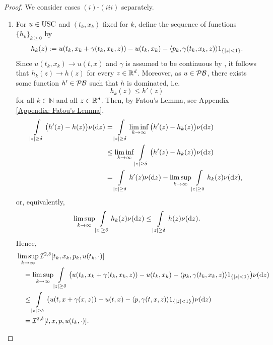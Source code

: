\begin{proof}
    We consider cases $(i)$-$(iii)$ separately. 
    \begin{enumerate}[label=(\roman*)]
        \item For $u \in \operatorname{USC}$ and $(t_k,x_k)$ fixed for $k$, define the sequence of functions $\{h_k\}_{k \geq 0}$ by
        \begin{equation*}
            h_k(z) := u(t_k, x_k + \gamma(t_k,x_k,z)) - u(t_k,x_k) - \langle p_k, \gamma(t_k,x_k,z) \rangle 1_{\left\{|z| < 1\right\}}. 
        \end{equation*}
        Since $u(t_k,x_k) \rightarrow u(t,x)$ and $\gamma$ is assumed to be continuous by , it follows that $h_k(z) \rightarrow h(z)$ for every $z \in \mathbb{R}^d$.  Moreover, as $u \in \mathcal{PB}$, there exists some function $h' \in \mathcal{PB}$ such that $h$ is dominated, i.e.
        \begin{equation*}
            h_k(z) \leq h'(z)
        \end{equation*}
        for all $k \in \mathbb N$ and all $z \in \mathbb{R}^d$. Then, by Fatou's Lemma, see Appendix \ref{Appendix: Fatou's Lemma}, 
        \begin{align*}
            \int\limits_{|z| \geq \delta} \big( h'(z) - h(z) \big) \nu(\mathrm{d} z) &= \int\limits_{|z| \geq \delta} \liminf_{k \rightarrow \infty}\big( h'(z) - h_k(z) \big) \nu (\mathrm{d} z) \\
            & \leq \liminf_{k \rightarrow \infty} \int\limits_{|z| \geq \delta} \big( h'(z) - h_k(z) \big) \nu(\mathrm{d} z) \\
            &= \int\limits_{|z| \geq \delta} h'(z) \nu (\mathrm{d} z) - \limsup_{k \rightarrow \infty} \int\limits_{|z| \geq \delta} h_k(z) \nu (\mathrm{d} z),
        \end{align*}
        or, equivalently, 
        \begin{equation*}
            \limsup_{k \rightarrow \infty} \int\limits_{|z| \geq \delta} h_k(z) \nu (\mathrm{d} z) \leq \int\limits_{|z| \geq \delta} h(z) \nu(\mathrm{d} z). 
        \end{equation*}
        Hence, 
        \begin{align*}
            & \limsup_{k \rightarrow \infty}\mathcal{I}^{2,\delta}[t_k,x_k,p_k,u(t_k,\cdot)] \\
            &\quad = \limsup_{k \rightarrow \infty} \int\limits_{|z| \geq \delta} \big( u(t_k,x_k + \gamma(t_k,x_k,z)) - u(t_k,x_k) - \langle p_k, \gamma(t_k,x_k,z) \rangle 1_{\left\{|z| < 1\right\}} \big) \nu (\mathrm{d} z) \\
            &\quad \leq \int\limits_{|z| \geq \delta} \big( u(t,x+\gamma(x,z)) - u(t,x) - \langle p, \gamma(t,x,z) \rangle 1_{\left\{|z| < 1\right\}} \big) \nu(\mathrm{d} z) \\
            &\quad = \mathcal{I}^{2,\delta} [t,x,p,u(t_k,\cdot)]. 
        \end{align*}


\end{enumerate}
\end{proof}
